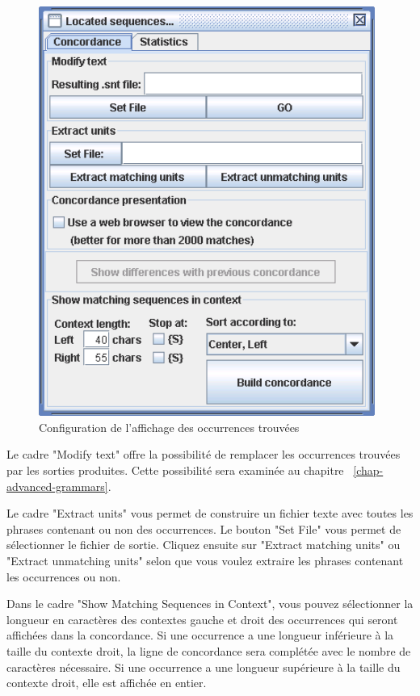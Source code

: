 \bigskip
\begin{figure}[h]
\begin{center}
\includegraphics[width=11cm]{resources/img/fig4-6.png}
\caption{Configuration de l’affichage des occurrences trouvées\label{fig-configuration-concordance}}
\end{center}
\end{figure}

\bigskip
\noindent Le cadre "Modify text" offre la possibilité de remplacer les occurrences trouvées par les
sorties produites. Cette possibilité sera examinée au chapitre
~\ref{chap-advanced-grammars}.

\bigskip
\noindent Le cadre "Extract units" vous permet de construire un fichier texte avec toutes les phrases
contenant ou non des occurrences. Le bouton "Set File" vous permet de sélectionner le fichier
de sortie. Cliquez ensuite sur "Extract matching units" ou "Extract unmatching units" selon
que vous voulez extraire les phrases contenant les occurrences ou non.


\bigskip
\noindent Dans le cadre "Show Matching Sequences in Context", vous pouvez sélectionner la
longueur en caractères des contextes gauche et droit des occurrences qui seront affichées dans
la concordance. Si une occurrence a une longueur inférieure à la taille du contexte droit, la
ligne de concordance sera complétée avec le nombre de caractères nécessaire. Si une occurrence 
a une longueur supérieure à la taille du contexte droit, elle est affichée en entier.


